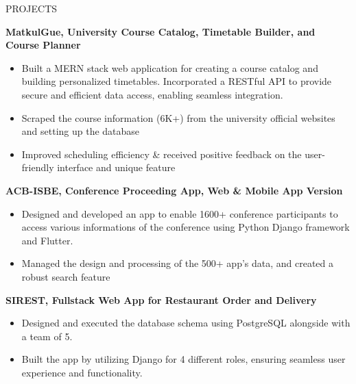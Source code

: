\documentclass{resume} %
\begin{document}

\begin{rSection}{PROJECTS}

{\bf MatkulGue, University Course Catalog, Timetable Builder, and Course Planner}
\vspace{-0.75em}
\begin{itemize}
\itemsep -7pt {}
\item Built a MERN stack web application for creating a course catalog and building personalized timetables. Incorporated a RESTful API to provide secure and efficient data access, enabling seamless integration.
\item Scraped the course information (6K+) from the university official websites and setting up the database
\item Improved scheduling efficiency \& received positive feedback on the user-friendly interface and unique feature
 \end{itemize}
 \vspace{-0.5em}

{\bf ACB-ISBE, Conference Proceeding App, Web \& Mobile App Version}
\vspace{-0.75em}
\begin{itemize}
\itemsep -7pt {}
\item Designed and developed an app to enable 1600+ conference participants to access various informations of the conference using Python Django framework and Flutter.
\item Managed the design and processing of the 500+ app's data, and created a robust search feature
 \end{itemize}
 \vspace{-0.5em}

{\bf SIREST, Fullstack Web App for Restaurant Order and Delivery}
\vspace{-0.75em}
\begin{itemize}
\itemsep -7pt {}
\item Designed and executed the database schema using PostgreSQL alongside with a team of 5.
\item Built the app by utilizing Django for 4 different roles, ensuring seamless user experience and functionality.
 \end{itemize}
 \vspace{-0.5em}


\end{rSection}
\end{document}
